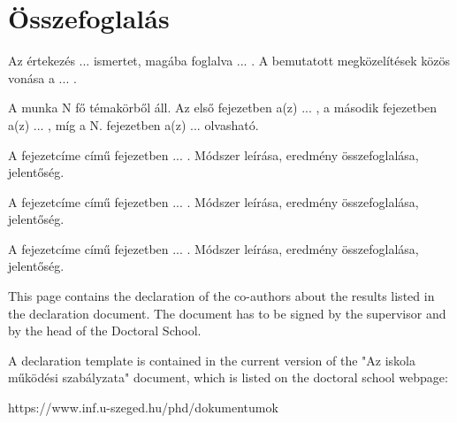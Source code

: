 \documentclass[12pt,a4paper]{extarticle}
\begin{document}
\vspace*{1em}


\renewcommand{\refname}{\large Other References }
 

\makeatletter
\apptocmd{\thebibliography}{\global\c@NAT@ctr 10\relax}{}{}
\makeatother




\newpage

\section{Összefoglalás}

Az értekezés ... ismertet, magába foglalva ... . A bemutatott megközelítések közös vonása a ... .

A munka N fő témakörből áll. Az első fejezetben a(z) ... , a második fejezetben a(z) ... , míg a N. fejezetben a(z) ... olvasható.

A fejezetcíme című fejezetben ... . Módszer leírása, eredmény összefoglalása, jelentőség.

A fejezetcíme című fejezetben ... . Módszer leírása, eredmény összefoglalása, jelentőség.

A fejezetcíme című fejezetben ... . Módszer leírása, eredmény összefoglalása, jelentőség.


\newpage


\newpage

This page contains the declaration of the co-authors about the results listed in the declaration document. The document has to be signed by the supervisor and by the head of the Doctoral School. 

A declaration template is contained in the current version of the "Az iskola működési szabályzata" document, which is listed on the doctoral school webpage:

https://www.inf.u-szeged.hu/phd/dokumentumok


\newpage
\thispagestyle{empty}
\mbox{}
\newpage
\end{document}

